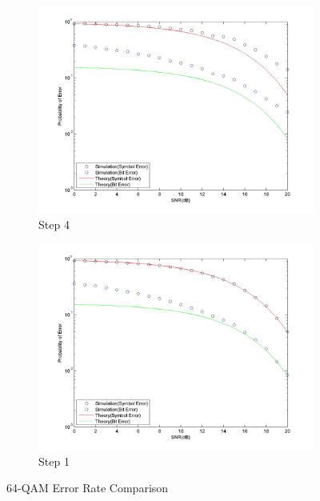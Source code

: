 \documentclass[]{article}
\begin{document}
\newpage
\begin{figure}[h]
        \centering
        \begin{subfigure}[b]{0.6\textwidth}
                \includegraphics[width=\textwidth]{qam64SNR.jpg}
                \caption{Step 4}
                \label{fig:qam64SNR}
        \end{subfigure}%
        \qquad \quad %
        \begin{subfigure}[b]{0.6\textwidth}
                \includegraphics[width=\textwidth]{qam64SNRstep1.jpg}
                \caption{Step 1}
                \label{fig:qam64SNR1}
        \end{subfigure}
        \caption{64-QAM Error Rate Comparison}
\end{figure}
\end{document}
